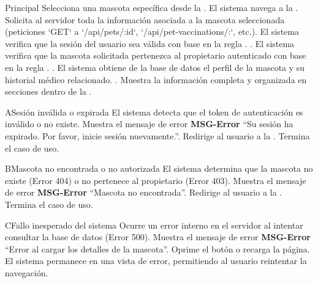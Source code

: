 \begin{UCtrayectoria}{Principal}
	\UCpaso[\UCactor] Selecciona una mascota específica desde la . \label{CU14-Start}
	\UCpaso El sistema navega a la .
	\UCpaso Solicita al servidor toda la información asociada a la mascota seleccionada (peticiones `GET` a `/api/pets/:id`, `/api/pet-vaccinations/:`, etc.).
	\UCpaso El sistema verifica que la sesión del usuario sea válida con base en la regla . .
	\UCpaso El sistema verifica que la mascota solicitada pertenezca al propietario autenticado con base en la regla . .
	\UCpaso El sistema obtiene de la base de datos el perfil de la mascota y su historial médico relacionado. .
	\UCpaso Muestra la información completa y organizada en secciones dentro de la .
\end{UCtrayectoria}


\begin{UCtrayectoriaA}{A}{Sesión inválida o expirada}
	\UCpaso El sistema detecta que el token de autenticación es inválido o no existe.
	\UCpaso Muestra el mensaje de error {\bf MSG-Error} ``Su sesión ha expirado. Por favor, inicie sesión nuevamente.''.
	\UCpaso[] Redirige al usuario a la .
	\UCpaso[] Termina el caso de uso.
\end{UCtrayectoriaA}

\begin{UCtrayectoriaA}{B}{Mascota no encontrada o no autorizada}
	\UCpaso El sistema determina que la mascota no existe (Error 404) o no pertenece al propietario (Error 403).
	\UCpaso Muestra el mensaje de error {\bf MSG-Error} ``Mascota no encontrada''.
	\UCpaso[] Redirige al usuario a la .
	\UCpaso[] Termina el caso de uso.
\end{UCtrayectoriaA}

\begin{UCtrayectoriaA}{C}{Fallo inesperado del sistema}
	\UCpaso Ocurre un error interno en el servidor al intentar consultar la base de datos (Error 500).
	\UCpaso Muestra el mensaje de error {\bf MSG-Error} ``Error al cargar los detalles de la mascota''.
	\UCpaso[\UCactor] Oprime el botón  o recarga la página.
	\UCpaso[] El sistema permanece en una vista de error, permitiendo al usuario reintentar la navegación.
\end{UCtrayectoriaA}

